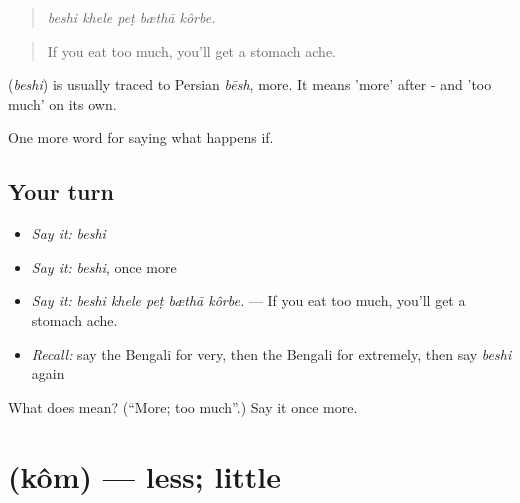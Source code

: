 \begin{quote}
    
\end{quote}

\begin{quote}
\emph{beshi khele peṭ bæthā kôrbe.}
\end{quote}

\begin{quote}
If you eat too much, you'll get a stomach ache.
\end{quote}

\begin{cousinweb}
\textbf{} (\emph{beshi}) is usually traced to Persian \emph{bēsh}, more. It means 'more' after -  and 'too much' on its own.
\end{cousinweb}

\begin{grammarlens}[title={What you've built}]
One more word for saying what happens if.
\end{grammarlens}

\subsection*{Your turn}
\begin{itemize}
\raggedright
  \item \emph{Say it:} \emph{beshi}
  \item \emph{Say it:} \emph{beshi}, once more
  \item \emph{Say it:} \emph{beshi khele peṭ bæthā kôrbe.} — If you eat too much, you'll get a stomach ache.
  \item \emph{Recall:} say the Bengali for very, then the Bengali for extremely, then say \emph{beshi} again
\end{itemize}

\begin{tcolorbox}[breakable,colback=teal!4,colframe=teal!35!black,title={Before you move on}]
What does  mean? (\textquotedblleft{}More; too much\textquotedblright{}.) Say it once more.
\end{tcolorbox}
\section[\texorpdfstring{\bn{কম} (kôm)}{কম (kôm)}]{ (kôm) — less; little}

\label{lesson:BN-C370-kom}



